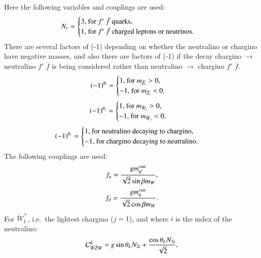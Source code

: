 \documentclass[final,3p,times]{elsarticle}
\begin{document}
Here the following variables and couplings are used:
\begin{equation}
N_{c} = \begin{cases}  3, $ for $f'$ $\bar{f}$ quarks, $\\
					   1, $ for $f'$ $\bar{f}$ charged leptons or neutrinos$. \\
						\end{cases}
\end{equation}
There are several factors of (-1) depending on whether the neutralino or chargino have negative masses, and also there are factors of (-1) if the decay chargino $\rightarrow$ neutralino $f'$ $\bar{f}$ is being considered rather than neutralino $\rightarrow$ chargino $f'$ $\bar{f}$.
\begin{equation}
(-1)^{\theta_i} = \begin{cases}	1, $ for $ m_{\tilde{Z}_i} > 0$,$ \\
								-1, $ for $ m_{\tilde{Z}_i} < 0. \\
								\end{cases}
\end{equation}
\begin{equation}
(-1)^{\theta_j} = \begin{cases}	1, $ for $ m_{\tilde{W}_j} > 0$,$ \\
								-1, $ for $m_{\tilde{W}_j} < 0. \\
								\end{cases}
\end{equation}
\begin{equation}
(-1)^{\theta_c} = \begin{cases} 1, $ for neutralino decaying to chargino, $\\
								-1, $ for chargino decaying to neutralino. $ \\
								\end{cases}
\end{equation}
The following couplings are used:
\begin{equation}
f_{u} = {g m_{q'}^{run} \over \sqrt{2} \sin\beta m_{W}},
\end{equation}
\begin{equation}
f_{d} = {g m_{q}^{run} \over \sqrt{2} \cos\beta m_{W}}.
\end{equation}
For $\tilde{W}^{+}_{1}$, i.e.\ the lightest chargino ($j = 1$), and where $i$ is the index of the neutralino:
\begin{equation}
\mathcal{C}_{\tilde{W} \tilde{Z} W}^L = g\sin\theta_L N_{2i} + {\cos\theta_L N_{3i} \over \sqrt{2}},
\end{equation}
\end{document}
